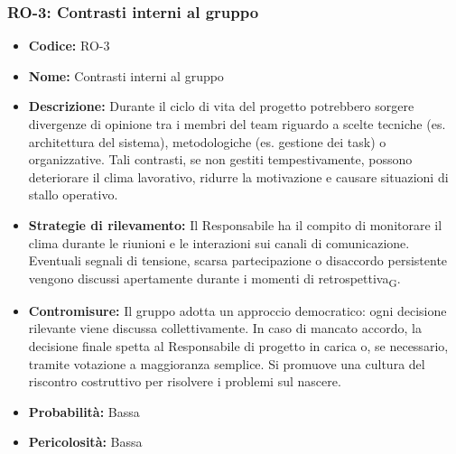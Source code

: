 \documentclass[a4paper, 10pt, colorlinks=true, linkcolor=black, urlcolor=blue, citecolor=blue, hidelinks]{article}
\begin{document}
\subsubsection{RO-3: Contrasti interni al gruppo}
\begin{itemize}
    \item \textbf{Codice:} RO-3 
    \item \textbf{Nome:} Contrasti interni al gruppo

    \item \textbf{Descrizione:} Durante il ciclo di vita del progetto potrebbero sorgere divergenze di opinione tra i membri del team riguardo a scelte tecniche (es. architettura del sistema), metodologiche (es. gestione dei task) o organizzative. Tali contrasti, se non gestiti tempestivamente, possono deteriorare il clima lavorativo, ridurre la motivazione e causare situazioni di stallo operativo.

    \item \textbf{Strategie di rilevamento:} Il Responsabile ha il compito di monitorare il clima durante le riunioni e le interazioni sui canali di comunicazione. Eventuali segnali di tensione, scarsa partecipazione o disaccordo persistente vengono discussi apertamente durante i momenti di retrospettiva\textsubscript{G}.

    \item \textbf{Contromisure:} Il gruppo adotta un approccio democratico: ogni decisione rilevante viene discussa collettivamente. In caso di mancato accordo, la decisione finale spetta al Responsabile di progetto in carica o, se necessario, tramite votazione a maggioranza semplice. Si promuove una cultura del riscontro costruttivo per risolvere i problemi sul nascere.

    \item \textbf{Probabilità:} Bassa

    \item \textbf{Pericolosità:} Bassa
\end{itemize}
\end{document}

